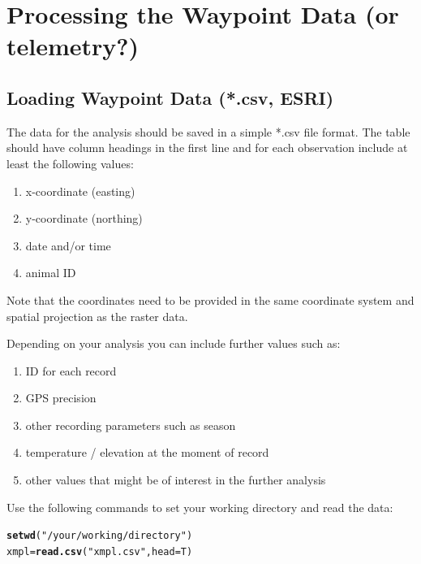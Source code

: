 \documentclass[11pt, a4paper]{article}\usepackage[]{graphicx}\usepackage[]{color}
\makeatletter
\newcommand{\hlstr}[1]{\textcolor[rgb]{0.192,0.494,0.8}{#1}}%
\newcommand{\hlstd}[1]{\textcolor[rgb]{0.345,0.345,0.345}{#1}}%
\newcommand{\hlkwb}[1]{\textcolor[rgb]{0.69,0.353,0.396}{#1}}%
\newcommand{\hlkwc}[1]{\textcolor[rgb]{0.333,0.667,0.333}{#1}}%
\newcommand{\hlkwd}[1]{\textcolor[rgb]{0.737,0.353,0.396}{\textbf{#1}}}%
\newenvironment{kframe}{%
 \def\at@end@of@kframe{}%
 \ifinner\ifhmode%
  \def\at@end@of@kframe{\end{minipage}}%
  \begin{minipage}{\columnwidth}%
 \fi\fi%
 \def\FrameCommand##1{\hskip\@totalleftmargin \hskip-\fboxsep
 \colorbox{shadecolor}{##1}\hskip-\fboxsep
     \hskip-\linewidth \hskip-\@totalleftmargin \hskip\columnwidth}%
 \MakeFramed {\advance\hsize-\width
   \@totalleftmargin\z@ \linewidth\hsize
   \@setminipage}}%
 {\par\unskip\endMakeFramed%
 \at@end@of@kframe}
\newenvironment{knitrout}{}{} %
\makeatother
\begin{document}
\section{Processing the Waypoint Data (or telemetry?)}

\subsection{Loading Waypoint Data (*.csv, ESRI)}%

The data for the analysis should be saved in a simple *.csv file format. The table should have column headings in the first line and for each observation include at least the following values: 
\begin{enumerate}
\item{x-coordinate (easting)}
\item{y-coordinate (northing)}
\item{date and/or time}
\item{animal ID}
\end{enumerate}

\noindent Note that the coordinates need to be provided in the same coordinate system and spatial projection as the raster data.

Depending on your analysis you can include further values such as:
\begin{enumerate}
\item{ID for each record}
\item{GPS precision}
\item{other recording parameters such as season}
\item{temperature / elevation at the moment of record}
\item{other values that might be of interest in the further analysis}
\end{enumerate}


\noindent Use the following commands to set your working directory and read the data:
\begin{knitrout}
\color{fgcolor}\begin{kframe}
\begin{alltt}
\hlkwd{setwd}\hlstd{(}\hlstr{"/your/working/directory"}\hlstd{)}
\hlstd{xmpl} \hlkwb{=} \hlkwd{read.csv}\hlstd{(}\hlstr{"xmpl.csv"}\hlstd{,} \hlkwc{head}\hlstd{=T)}
\end{alltt}
\end{kframe}
\end{knitrout}
\end{document}
